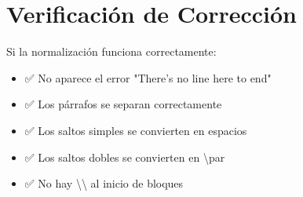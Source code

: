 \documentclass{sener2025}
\begin{document}
\section{Verificación de Corrección}

Si la normalización funciona correctamente:
\begin{itemize}
  \item ✅ No aparece el error "There's no line here to end"
  \item ✅ Los párrafos se separan correctamente
  \item ✅ Los saltos simples se convierten en espacios
  \item ✅ Los saltos dobles se convierten en \textbackslash par
  \item ✅ No hay \textbackslash\textbackslash{} al inicio de bloques
\end{itemize}
\end{document}
